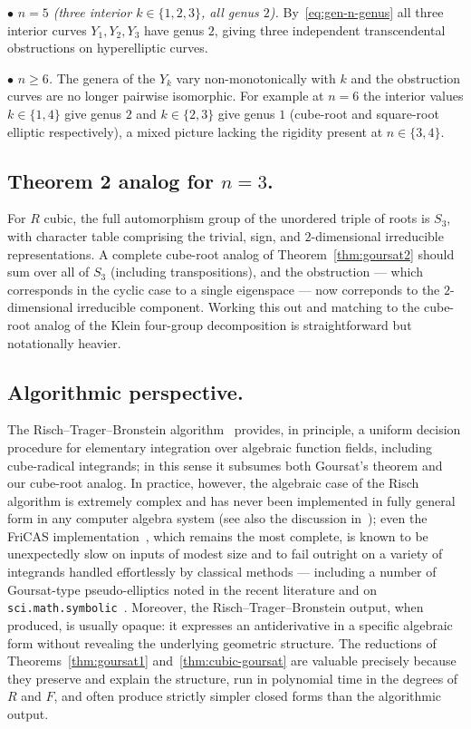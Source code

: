 \documentclass[11pt,a4paper]{article}
\theoremstyle{plain}
\theoremstyle{definition}
\theoremstyle{remark}
\begin{document}
\smallskip\noindent
$\bullet$ \emph{$n=5$ (three interior $k\in\{1,2,3\}$, all genus $2$).} By~\eqref{eq:gen-n-genus} all three interior curves $Y_1, Y_2, Y_3$ have genus $2$, giving three independent transcendental obstructions on hyperelliptic curves.

\smallskip\noindent
$\bullet$ \emph{$n\geq 6$.} The genera of the $Y_k$ vary non-monotonically with $k$ and the obstruction curves are no longer pairwise isomorphic. For example at $n = 6$ the interior values $k\in\{1,4\}$ give genus $2$ and $k\in\{2,3\}$ give genus $1$ (cube-root and square-root elliptic respectively), a mixed picture lacking the rigidity present at $n\in\{3,4\}$.

\subsection*{Theorem 2 analog for $n=3$.}
For $R$ cubic, the full automorphism group of the unordered triple of roots is $S_3$, with character table comprising the trivial, sign, and $2$-dimensional irreducible representations. A complete cube-root analog of Theorem~\ref{thm:goursat2} should sum over all of $S_3$ (including transpositions), and the obstruction --- which corresponds in the cyclic case to a single eigenspace --- now correponds to the $2$-dimensional irreducible component. Working this out and matching to the cube-root analog of the Klein four-group decomposition is straightforward but notationally heavier.

\subsection*{Algorithmic perspective.}
The Risch--Trager--Bronstein algorithm~\cite{Risch1969,Risch1970,Davenport1981,Trager1984,Bronstein1990,Bronstein2005} provides, in principle, a uniform decision procedure for elementary integration over algebraic function fields, including cube-radical integrands; in this sense it subsumes both Goursat's theorem and our cube-root analog. In practice, however, the algebraic case of the Risch algorithm is extremely complex and has never been implemented in fully general form in any computer algebra system (see also the discussion in~\cite{Blake2020}); even the FriCAS implementation~\cite{Trager1984}, which remains the most complete, is known to be unexpectedly slow on inputs of modest size and to fail outright on a variety of integrands handled effortlessly by classical methods --- including a number of Goursat-type pseudo-elliptics noted in the recent literature and on \texttt{sci.math.symbolic}~\cite{WelzNewsgroup}. Moreover, the Risch--Trager--Bronstein output, when produced, is usually opaque: it expresses an antiderivative in a specific algebraic form without revealing the underlying geometric structure. The reductions of Theorems~\ref{thm:goursat1} and~\ref{thm:cubic-goursat} are valuable precisely because they preserve and explain the structure, run in polynomial time in the degrees of $R$ and $F$, and often produce strictly simpler closed forms than the algorithmic output.
\end{document}
